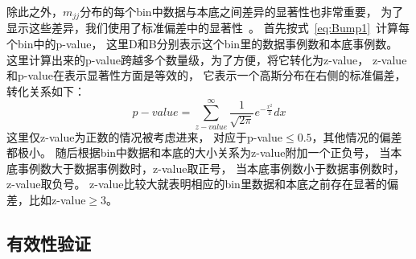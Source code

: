 除此之外，$m_{jj}$分布的每个bin中数据与本底之间差异的显著性也非常重要，
为了显示这些差异，我们使用了标准偏差中的显著性~\cite{ZVA}。
首先按式~\ref{eq:Bump1}~计算每个bin中的p-value，
这里D和B分别表示这个bin里的数据事例数和本底事例数。
这里计算出来的p-value跨越多个数量级，为了方便，将它转化为z-value，
z-value和p-value在表示显著性方面是等效的，
它表示一个高斯分布在右侧的标准偏差，转化关系如下：
\begin{equation} 
\label{eq:Bump3}
p-value=\sum_{z-value}^{\infty} \frac{1}{\sqrt{2\pi}} e^{-\frac{x^2}{2}} dx
\end{equation}
这里仅z-value为正数的情况被考虑进来，
对应于p-value$\le 0.5$，其他情况的偏差都极小。 
随后根据bin中数据和本底的大小关系为z-value附加一个正负号，
当本底事例数大于数据事例数时，z-value取正号，
当本底事例数小于数据事例数时，z-value取负号。
z-value比较大就表明相应的bin里数据和本底之前存在显著的偏差，比如z-value$\geq 3$。


\subsection{有效性验证}
\label{sec:DijetMjj3}

